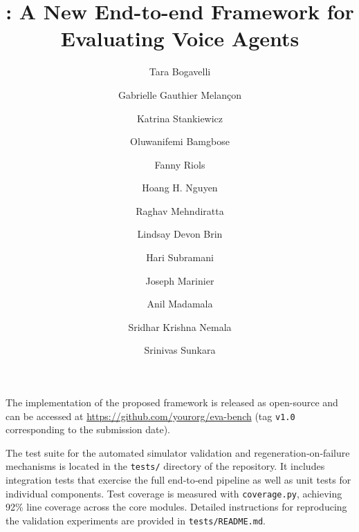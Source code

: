 \documentclass[]{latex/servicenow/servicenow} %
\title{\framework: A New End-to-end Framework for Evaluating Voice Agents}
\author{Tara Bogavelli}
\author{Gabrielle Gauthier Melançon}
\author{Katrina Stankiewicz}
\author{Oluwanifemi Bamgbose}
\author{Fanny Riols}
\author{Hoang H. Nguyen}
\author{Raghav Mehndiratta}
\author{Lindsay Devon Brin}
\author{Hari Subramani}
\author{Joseph Marinier}
\author{Anil Madamala}
\author{Sridhar Krishna Nemala}
\author{Srinivas Sunkara}
\affiliation{ServiceNow}
\theoremstyle{plain}
\theoremstyle{definition}
\theoremstyle{remark}
\begin{document}
The implementation of the proposed framework is released as open-source and can be accessed at
\url{https://github.com/yourorg/eva-bench} (tag \texttt{v1.0} corresponding to the submission date).

\maketitle









\newpage


The test suite for the automated simulator validation and regeneration‑on‑failure mechanisms is located in the \texttt{tests/} directory of the repository. It includes integration tests that exercise the full end‑to‑end pipeline as well as unit tests for individual components. Test coverage is measured with \texttt{coverage.py}, achieving 92\% line coverage across the core modules. Detailed instructions for reproducing the validation experiments are provided in \texttt{tests/README.md}.
\end{document}
